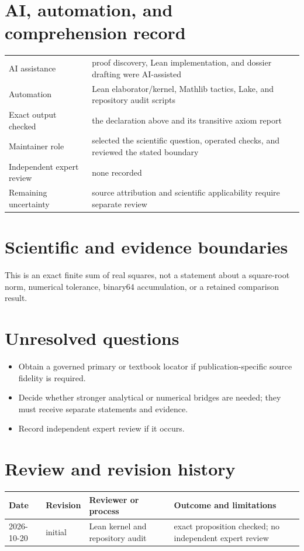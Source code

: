 \documentclass[11pt]{article}
\begin{document}
\section{AI, automation, and comprehension record}
\begin{tabularx}{\textwidth}{@{}lY@{}}\toprule
AI assistance & proof discovery, Lean implementation, and dossier drafting were AI-assisted \\
Automation & Lean elaborator/kernel, Mathlib tactics, Lake, and repository audit scripts \\
Exact output checked & the declaration above and its transitive axiom report \\
Maintainer role & selected the scientific question, operated checks, and reviewed the stated boundary \\
Independent expert review & none recorded \\
Remaining uncertainty & source attribution and scientific applicability require separate review \\
\bottomrule\end{tabularx}

\section{Scientific and evidence boundaries}
This is an exact finite sum of real squares, not a statement about a square-root norm, numerical tolerance, binary64 accumulation, or a retained comparison result.

\section{Unresolved questions}
\begin{itemize}
\item Obtain a governed primary or textbook locator if publication-specific source fidelity is required.
\item Decide whether stronger analytical or numerical bridges are needed; they must receive separate statements and evidence.
\item Record independent expert review if it occurs.
\end{itemize}

\section{Review and revision history}
\begin{tabularx}{\textwidth}{@{}lllX@{}}\toprule
Date & Revision & Reviewer or process & Outcome and limitations \\
\midrule
2026-10-20 & initial & Lean kernel and repository audit & exact proposition checked; no independent expert review \\
\bottomrule\end{tabularx}
\end{document}

